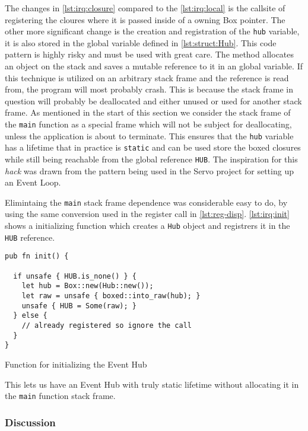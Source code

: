 The changes in \autoref{lst:irq:closure} compared to the \autoref{lst:irq:local} is the callsite of registering the cloures where it is passed inside of a owning Box pointer. 
The other more significant change is the creation and registration of the \texttt{hub} variable, it is also stored in the global variable defined in \autoref{lst:struct:Hub}.
This code pattern is highly risky and must be used with great care.
The method allocates an object on the stack and saves a mutable reference to it in an global variable.
If this technique is utilized on an arbitrary stack frame and the reference is read from, the program will most probably crash.
This is because the stack frame in question will probably be deallocated and either unused or used for another stack frame.
As mentioned in the start of this section we consider the stack frame of the \texttt{main} function as a special frame which will not be subject for deallocating, unless the application is about to terminate.
This ensures that the \texttt{hub} variable has a lifetime that in practice is \texttt{static} and can be used store the boxed closures while still being reachable from the global reference \texttt{HUB}.
The inspiration for this \textit{hack} was drawn from the pattern being used in the Servo \cite{web:servo} project for setting up an Event Loop.

Elimintaing the \texttt{main} stack frame dependence was considerable easy to do, by using the same conversion used in the register call in \autoref{lst:reg-disp}.
\autoref{lst:irq:init} shows a initializing function which creates a \texttt{Hub} object and registrers it in the \texttt{HUB} reference.

\begin{listing}[H]
  \begin{verbatim}
pub fn init() {

  if unsafe { HUB.is_none() } {
    let hub = Box::new(Hub::new());
    let raw = unsafe { boxed::into_raw(hub); }
    unsafe { HUB = Some(raw); }
  } else {
    // already registered so ignore the call
  }
}
  \end{verbatim}
  \caption{Function for initializing the Event Hub}
  \label{lst:irq:init}
\end{listing}

This lets us have an Event Hub with truly static lifetime without allocating it in the \texttt{main} function stack frame.

\subsubsection{Discussion}

